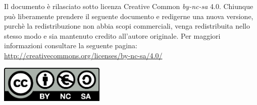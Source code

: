 Il documento è rilasciato sotto licenza Creative Common \textit{by-nc-sa} 4.0. Chiunque può liberamente prendere il seguente documento e redigerne una nuova versione, purchè la redistribuzione non abbia scopi commerciali, venga redistribuita nello stesso modo e sia mantenuto credito all'autore originale. Per maggiori informazioni consultare la seguente pagina: \url{http://creativecommons.org/licenses/by-nc-sa/4.0/}

\begin{center}

\includegraphics[width=50mm]{images/cc.png}

\end{center}
